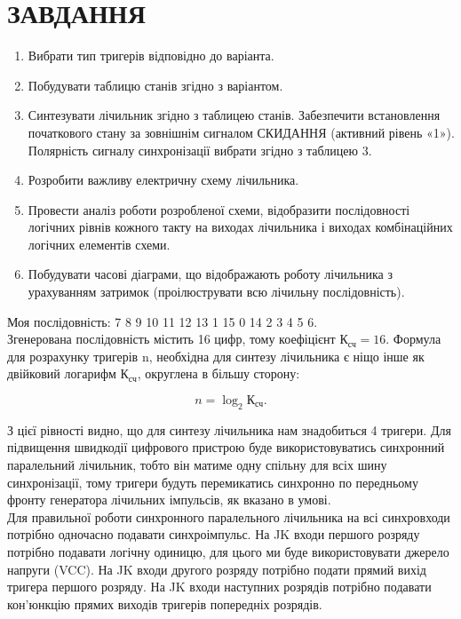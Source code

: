 \documentclass[a4paper,14pt]{extreport}
\begin{document}
\chapter{ЗАВДАННЯ }
  \begin{enumerate}
  \item  Вибрати тип тригерів відповідно до варіанта.
\item Побудувати таблицю станів згідно з варіантом.
\item Синтезувати лічильник згідно з таблицею станів. Забезпечити встановлення початкового стану за зовнішнім сигналом СКИДАННЯ (активний рівень «1»). Полярність сигналу синхронізації вибрати згідно з таблицею 3.
\item Розробити важливу електричну схему лічильника.
\item Провести аналіз роботи розробленої схеми, відобразити послідовності логічних рівнів кожного такту на виходах лічильника і виходах комбінаційних логічних елементів схеми.
\item Побудувати часові діаграми, що відображають роботу лічильника з урахуванням затримок (проілюструвати всю лічильну послідовність).
  \end{enumerate}
Моя послідовність: 7 8 9 10 11 12 13 1 15 0 14 2 3 4 5 6.\\ 

Згенерована послідовність містить 16 цифр, тому коефіцієнт $\text{К}_{\text{сч}} = 16$. Формула для розрахунку тригерів n, необхідна для синтезу лічильника є ніщо інше як двійковий логарифм $\text{К}_{\text{сч}}$, округлена в більшу сторону:

\begin{equation}
n = \log_2\text{К}_{\text{сч}}.
\end{equation}

З цієї рівності видно, що для синтезу лічильника нам знадобиться 4 тригери.
Для підвищення швидкодії цифрового пристрою буде використовуватись синхронний паралельний лічильник, тобто він матиме одну спільну для всіх шину синхронізації, тому тригери будуть перемикатись синхронно по передньому фронту генератора лічильних імпульсів, як вказано в умові.\\



 Для правильної роботи синхронного паралельного лічильника на всі синхровходи потрібно одночасно подавати синхроімпульс. На JK входи першого розряду потрібно подавати логічну одиницю, для цього ми буде використовувати джерело напруги (VCC). На JK входи другого розряду потрібно подати прямий вихід тригера першого розряду. На JK входи наступних розрядів потрібно подавати кон'юнкцію прямих виходів тригерів попередніх розрядів.
\end{document}
